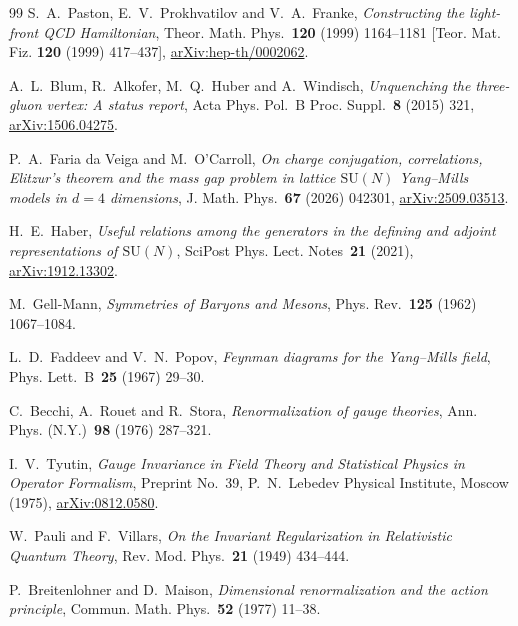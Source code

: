 \documentclass[UTF8,a4paper,11pt,fontset=fandol]{ctexart}
\theoremstyle{cplain}
\theoremstyle{cdefinition}
\theoremstyle{cremark}
\numberwithin{equation}{section}
\begin{document}
\begin{thebibliography}{99}
S.~A.~Paston, E.~V.~Prokhvatilov and V.~A.~Franke, \emph{Constructing the light-front QCD Hamiltonian}, Theor. Math. Phys.~\textbf{120} (1999) \mbox{1164--1181} [Teor. Mat. Fiz. \textbf{120} (1999) \mbox{417--437}], \href{https://arxiv.org/abs/hep-th/0002062}{arXiv:hep-th/0002062}.

A.~L.~Blum, R.~Alkofer, M.~Q.~Huber and A.~Windisch, \emph{Unquenching the three-gluon vertex: A status report}, Acta Phys. Pol.~B Proc. Suppl.~\textbf{8} (2015) \mbox{321}, \href{https://arxiv.org/abs/1506.04275}{arXiv:1506.04275}.

P.~A.~Faria da Veiga and M.~O'Carroll, \emph{On charge conjugation, correlations, Elitzur's theorem and the mass gap problem in lattice $\mathrm{SU}(N)$ Yang--Mills models in $d=4$ dimensions}, J. Math. Phys.~\textbf{67} (2026) \mbox{042301}, \href{https://arxiv.org/abs/2509.03513}{arXiv:2509.03513}.

H.~E.~Haber, \emph{Useful relations among the generators in the defining and adjoint representations of $\mathrm{SU}(N)$}, SciPost Phys. Lect. Notes~\textbf{21} (2021), \href{https://arxiv.org/abs/1912.13302}{arXiv:1912.13302}.

M.~Gell-Mann, \emph{Symmetries of Baryons and Mesons}, Phys. Rev.~\textbf{125} (1962) \mbox{1067--1084}.

L.~D.~Faddeev and V.~N.~Popov, \emph{Feynman diagrams for the Yang--Mills field}, Phys. Lett.~B~\textbf{25} (1967) \mbox{29--30}.

C.~Becchi, A.~Rouet and R.~Stora, \emph{Renormalization of gauge theories}, Ann. Phys. (N.Y.)~\textbf{98} (1976) \mbox{287--321}.

I.~V.~Tyutin, \emph{Gauge Invariance in Field Theory and Statistical Physics in Operator Formalism}, Preprint No.~39, P.~N.~Lebedev Physical Institute, Moscow (1975), \href{https://arxiv.org/abs/0812.0580}{arXiv:0812.0580}.

W.~Pauli and F.~Villars, \emph{On the Invariant Regularization in Relativistic Quantum Theory}, Rev. Mod. Phys.~\textbf{21} (1949) \mbox{434--444}.

P.~Breitenlohner and D.~Maison, \emph{Dimensional renormalization and the action principle}, Commun. Math. Phys.~\textbf{52} (1977) \mbox{11--38}.


\end{thebibliography}
\end{document}
